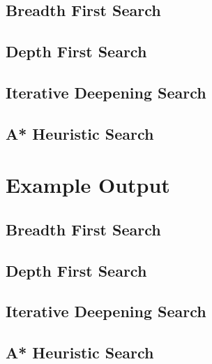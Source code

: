 \documentclass[a4paper]{article}
\begin{document}
\begin{appendices}
  \subsection{Breadth First Search}
  \label{app:evidence-bfs}
  

  \subsection{Depth First Search}
  \label{app:evidence-dfs}
  

  \newpage
  \subsection{Iterative Deepening Search}
  \label{app:evidence-ids}
  

  \subsection{A* Heuristic Search}
  \label{app:evidence-a*}
  

  \newpage
  \section{Example Output}
  \subsection{Breadth First Search}
  \label{app:example-bfs}
  

  \newpage
  \subsection{Depth First Search}
  \label{app:example-dfs}
  

  \newpage
  \subsection{Iterative Deepening Search}
  \label{app:example-ids}
  

  \newpage
  \subsection{A* Heuristic Search}
  \label{app:example-a*}
  
\end{appendices}
\end{document}
